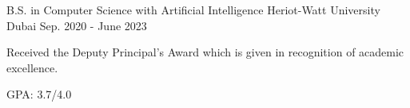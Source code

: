 

\begin{cventries}
	
	\cventry
	{B.S. in Computer Science with Artificial Intelligence} %
	{Heriot-Watt University} %
	{Dubai} %
	{Sep. 2020 - June 2023} %
	{
		\begin{cvitems} %
			\item {Received the Deputy Principal's Award which is given in recognition of academic excellence.}
			\item {GPA: 3.7/4.0}
		\end{cvitems}
	}
	
\end{cventries}
